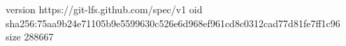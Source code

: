 version https://git-lfs.github.com/spec/v1
oid sha256:75aa9b24e71105b9e5599630c526e6d968ef961cd8c0312cad77d81fe7ff1c96
size 288667
